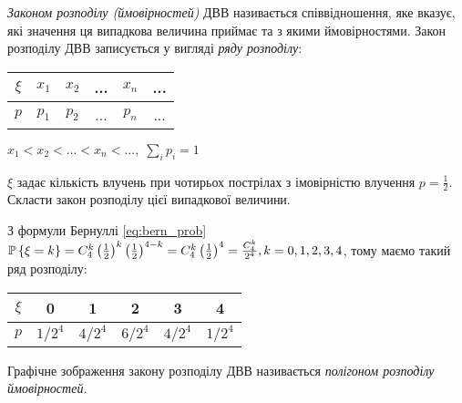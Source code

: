 \begin{definition}
    \emph{Законом розподілу (ймовірностей)} ДВВ називається співвідношення, яке вказує, 
    які значення ця випадкова величина приймає та з якими ймовірностями.
    Закон розподілу ДВВ записується у вигляді \emph{ряду розподілу}:
    \vspace{0.5em}
    
    \hspace{30pt}
    \begin{tabular}{|c|c|c|c|c|c|}
        \hline
        $\xi$ & $x_1$ & $x_2$ & ... & $x_n$ & ... \\
        \hline
        $p$ & $p_1$ & $p_2$ & ... & $p_n$ & ... \\
        \hline
    \end{tabular}
    \hspace{40pt}
    $x_1 < x_2 < ... < x_n < ...,\; \sum\limits_i p_i = 1$
\end{definition}
\begin{example}
    $\xi$ задає кількість влучень при чотирьох пострілах з імовірністю влучення 
    $p = \frac{1}{2}$. Скласти закон розподілу цієї випадкової величини.

    З формули Бернуллі \eqref{eq:bern_prob} $\P\left\{\xi = k\right\} = C_4^k \left(\frac{1}{2}\right)^k \left(\frac{1}{2}\right)^{4-k} = 
    C_4^k \left(\frac{1}{2}\right)^4 = \frac{C_4^k}{2^4}, k = 0,1,2,3,4$, тому маємо такий ряд розподілу:

    \begin{center}
        \begin{tabular}{|c|c|c|c|c|c|}
            \hline
            $\xi$ & 0 & 1 & 2 & 3 & 4 \\
            \hline
            $p$ & $1/2^4$ & $4/2^4$ & $6/2^4$ & $4/2^4$ & $1/2^4$ \\
            \hline
        \end{tabular}
    \end{center}
\end{example}
\begin{definition}
    Графічне зображення закону розподілу ДВВ називається 
    \emph{полігоном розподілу ймовірностей}.
\end{definition}

